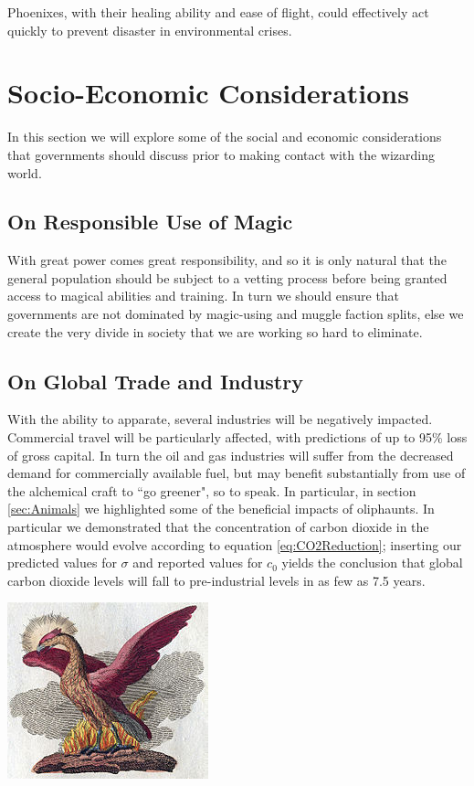 \documentclass[]{article}
\begin{document}
Phoenixes, with their healing ability and ease of flight, could effectively act quickly to prevent disaster in environmental crises.

\section{Socio-Economic Considerations}
In this section we will explore some of the social and economic considerations that governments should discuss prior to making contact with the wizarding world.

\subsection*{On Responsible Use of Magic}
With great power comes great responsibility, and so it is only natural that the general population should be subject to a vetting process before being granted access to magical abilities and training.
In turn we should ensure that governments are not dominated by magic-using and muggle faction splits, else we create the very divide in society that we are working so hard to eliminate.

\subsection*{On Global Trade and Industry} 
With the ability to apparate, several industries will be negatively impacted.
Commercial travel will be particularly affected, with predictions of up to 95\% loss of gross capital.
In turn the oil and gas industries will suffer from the decreased demand for commercially available fuel, but may benefit substantially from use of the alchemical craft to ``go greener", so to speak.
In particular, in section \ref{sec:Animals} we highlighted some of the beneficial impacts of oliphaunts.
In particular we demonstrated that the concentration of carbon dioxide in the atmosphere would evolve according to equation \ref{eq:CO2Reduction}; inserting our predicted values for $\sigma$ and reported values for $c_{0}$ yields the conclusion that global carbon dioxide levels will fall to pre-industrial levels in as few as 7.5 years.

\includegraphics{../images/Phoenix_Fabelwesen.jpg}
 
\end{document}
